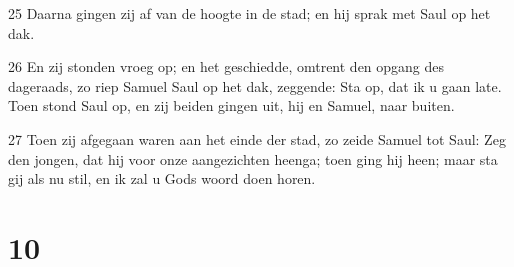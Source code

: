 \par 25 Daarna gingen zij af van de hoogte in de stad; en hij sprak met Saul op het dak.
\par 26 En zij stonden vroeg op; en het geschiedde, omtrent den opgang des dageraads, zo riep Samuel Saul op het dak, zeggende: Sta op, dat ik u gaan late. Toen stond Saul op, en zij beiden gingen uit, hij en Samuel, naar buiten.
\par 27 Toen zij afgegaan waren aan het einde der stad, zo zeide Samuel tot Saul: Zeg den jongen, dat hij voor onze aangezichten heenga; toen ging hij heen; maar sta gij als nu stil, en ik zal u Gods woord doen horen.

\chapter{10}

